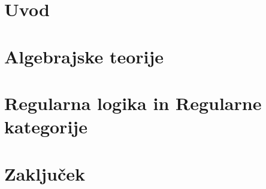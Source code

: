 \documentclass[12pt,a4paper]{book}
\begin{document}
%
\frontmatter

%
\mainmatter
\setcounter{page}{1}
\pagestyle{fancy}
%
\chapter{Uvod}

%
\chapter{Algebrajske teorije}

%
\chapter{Regularna logika in Regularne kategorije}

%
\chapter{Zaključek}

%
\end{document}
